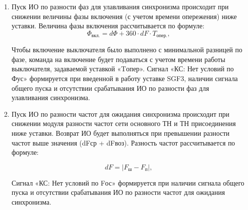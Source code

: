 \begin{enumerate}
\item
Пуск ИО по разности фаз для улавливания синхронизма происходит при снижении величины фазы включения (с учетом времени опережения) ниже уставки. Величина фазы включения рассчитывается по формуле:
\begin{equation*}
   \Phi_{\text{вкл.}}= d\Phi +  360 \cdot dF \cdot T_{\text{опер.}},
\end{equation*}
Чтобы включение выключателя было выполнено с минимальной разницей по фазе, команда на включение будет подаваться с учетом времени работы выключателя, задаваемой уставкой «Tопер».
Сигнал «КС: Нет условий по Фус» формируется при введенной в работу уставке SGF3, наличии сигнала общего пуска и отсутствии срабатывания ИО по разности фаз для улавливания синхронизма.

\item
Пуск ИО по разности частот для ожидания синхронизма происходит при снижении модуля разности частот сети основного ТН и ТН присоединения ниже уставки. Возврат ИО будет выполняться при превышении разности частот выше значения (dFср + dFвоз). Разность частот рассчитывается по формуле:

\begin{equation*}
    dF= \lvert F_{\text{ш}} - F_{\text{п}} \rvert ,
 \end{equation*}
 Сигнал «КС: Нет условий по Fос» формируется при наличии сигнала общего пуска и отсутствии срабатывания ИО по разности частот для ожидания синхронизма.


\end{enumerate}
